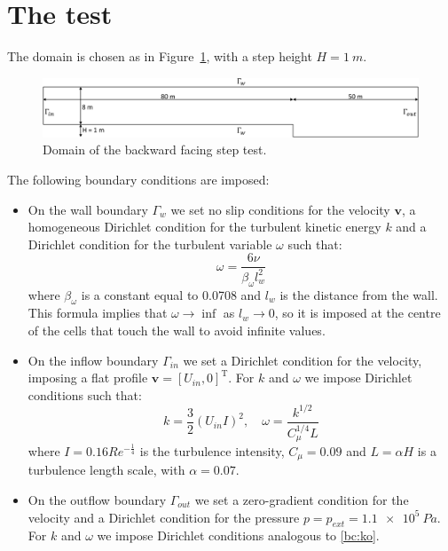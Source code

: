 \documentclass[11pt, a4paper]{article}
\theoremstyle{definition}
\begin{document}
\section{The test}
The domain is chosen as in Figure~\ref{fig:bfs_domain}, with a step height $H = 
\SI{1}{m}$. 
\begin{figure}[h]
	\centering
	\includegraphics[width=\textwidth]{bfs_domain}
	\caption{Domain of the backward facing step test.}
	\label{fig:bfs_domain}
\end{figure}
The following boundary conditions are imposed:
\begin{itemize}
	\item On the wall boundary $\Gamma_w$ we set no slip conditions for the 
	velocity 
	$\mathbf{v}$, a homogeneous Dirichlet condition for the turbulent kinetic 
	energy $k$ and a Dirichlet condition for the turbulent variable $\omega$ 
	such that:
	\begin{equation*}
	\omega = \frac{6 \nu}{\beta_\omega l_w^2}
	\end{equation*}
	where $\beta_\omega$ is a constant equal to 0.0708 and $l_w$ is the 
	distance from the wall. This formula implies that $\omega \rightarrow \inf$ 
	as $l_w \rightarrow 0$, so it is imposed at the centre of the cells that 
	touch the wall to avoid infinite values.
	\item On the inflow boundary $\Gamma_{in}$ we set a Dirichlet condition for 
	the velocity, imposing a flat profile $\mathbf{v} = [U_{in}, 
	0]^\mathrm{T}$. For $k$ and $\omega$ we impose Dirichlet conditions such 
	that:
	\begin{equation} \label{bc:ko}
	k = \frac{3}{2} (U_{in}I)^2, \quad \omega = \frac{k^{1/2}}{C_{\mu}^{1/4}L}
	\end{equation}
	where $I = 0.16 Re^{-\frac{1}{4}}$ is the turbulence intensity, $C_\mu = 
	0.09$ and $L = \alpha H$ is a turbulence length scale, with 
	$\alpha = 0.07$.
	\item On the outflow boundary $\Gamma_{out}$ we set a zero-gradient 
	condition for the velocity and a Dirichlet condition for the pressure $p = 
	p_{ext} = \SI{1.1e5}{Pa}$. For $k$ and $\omega$ we impose 
	Dirichlet conditions analogous to 
	\eqref{bc:ko}.
\end{itemize}
\end{document}
